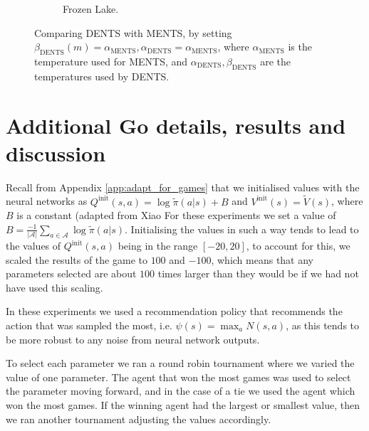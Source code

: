 \begin{figure}
\begin{subfigure}[b]{0.49\textwidth}
        \caption{Frozen Lake.}
    \end{subfigure}
    \caption{Comparing DENTS with MENTS, by setting $\beta_{\text{DENTS}}(m)=\alpha_{\text{MENTS}}, \alpha_{\text{DENTS}}=\alpha_{\text{MENTS}}$, where $\alpha_{\text{MENTS}}$ is the temperature used for MENTS, and $\alpha_{\text{DENTS}},\beta_{\text{DENTS}}$ are the temperatures used by DENTS.  }
    \label{fig:dbments}
\end{figure}














\section{Additional Go details, results and discussion} 
\label{appsec:go_hps}


    Recall from Appendix \ref{app:adapt_for_games} that we initialised values with the neural networks as $Q^{\text{init}}(s,a)=\log \tilde{\pi}(a|s)+B$ and $V^{\text{init}}(s)=\tilde{V}(s)$, where $B$ is a constant (adapted from Xiao  %
    For these experiments we set a value of $B=\frac{-1}{|\mathcal{A}|}\sum_{a\in\mathcal{A}} \log\tilde{\pi}(a|s)$. Initialising the values in such a way tends to lead to the values of $Q^{\text{init}}(s,a)$ being in the range $[-20,20]$, to account for this, we scaled the results of the game to $100$ and $-100$, which means that any parameters selected are about $100$ times larger than they would be if we had not have used this scaling.
    
    In these experiments we used a recommendation policy that recommends the action that was sampled the most, i.e. $\psi(s)=\max_a N(s,a)$, as this tends to be more robust to any noise from neural network outputs.
    
    To select each parameter we ran a round robin tournament where we varied the value of one parameter. The agent that won the most games was used to select the parameter moving forward, and in the case of a tie we used the agent which won the most games. If the winning agent had the largest or smallest value, then we ran another tournament adjusting the values accordingly.
    
